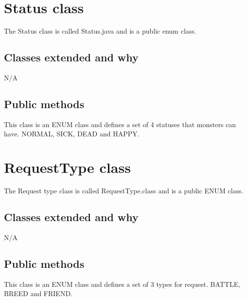 \documentclass{project}
\begin{document}
\section{Status class}
The Status class is called Status.java and is a public enum class.
\subsection{Classes extended and why}
N/A
\subsection{Public methods}
This class is an ENUM class and defines a set of 4 statuses that monsters can have. NORMAL, SICK, DEAD and HAPPY.


\section{RequestType class}
The Request type class is called RequestType.class and is a public ENUM class.
\subsection{Classes extended and why}
N/A
\subsection{Public methods}
This class is an ENUM class and defines a set of 3 types for request. BATTLE, BREED and FRIEND. 
\end{document}
